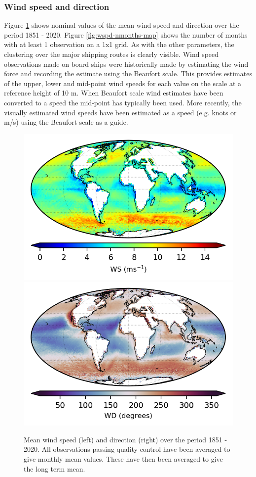 \subsubsection{Wind speed and direction}
Figure \ref{fig:wspd-map} shows nominal values of the mean wind speed and direction over the period 1851 - 2020. 
Figure \ref{fig:wspd-nmonths-map} shows the number of months with at least 1 observation on a 1x1 grid. 
As with the other parameters, the clustering over the major shipping routes is clearly visible. 
Wind speed observations made on board ships were historically made by estimating the wind force and recording the estimate using the Beaufort scale. 
This provides estimates of the upper, lower and mid-point wind speeds for each value on the scale at a reference height of 10 m. 
When Beaufort scale wind estimates have been converted to a speed the mid-point has typically been used. 
More recently, the visually estimated wind speeds have been estimated as a speed (e.g. knots or m/s) using the Beaufort scale as a guide. 

\begin{figure}[h]
    \includegraphics{resources/observations-ws-mean-map-optimal.png}
    \includegraphics{resources/observations-wd-mean-map-optimal.png}
    \caption{Mean wind speed (left) and direction (right) over the period 1851 - 2020. All observations passing quality control have been averaged to give monthly mean values. These have then been averaged to give the long term mean.}
    \label{fig:wspd-map}
\end{figure}

